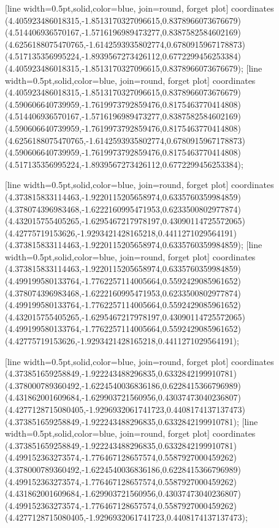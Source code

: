 [line width=0.5pt,solid,color=blue, join=round, forget plot] coordinates {(4.405923486018315,-1.8513170327096615,0.8378966073676679) (4.514406936570167,-1.5716196989473277,0.8387582584602169) (4.6256188075470765,-1.6142593935802774,0.6780915967178873) (4.517135356995224,-1.8939567273426112,0.6772299456253384) (4.405923486018315,-1.8513170327096615,0.8378966073676679)};
[line width=0.5pt,solid,color=blue, join=round, forget plot] coordinates {(4.405923486018315,-1.8513170327096615,0.8378966073676679) (4.590606640739959,-1.7619973792859476,0.8175463770414808) (4.514406936570167,-1.5716196989473277,0.8387582584602169) (4.590606640739959,-1.7619973792859476,0.8175463770414808) (4.6256188075470765,-1.6142593935802774,0.6780915967178873) (4.590606640739959,-1.7619973792859476,0.8175463770414808) (4.517135356995224,-1.8939567273426112,0.6772299456253384)};

[line width=0.5pt,solid,color=blue, join=round, forget plot] coordinates {(4.373815833114463,-1.9220115205658974,0.6335760359984859) (4.378074396983468,-1.6222160995471953,0.6233500802977874) (4.432015755405265,-1.6295467217978197,0.43090114725572065) (4.42775719153626,-1.9293421428165218,0.4411271029564191) (4.373815833114463,-1.9220115205658974,0.6335760359984859)};
[line width=0.5pt,solid,color=blue, join=round, forget plot] coordinates {(4.373815833114463,-1.9220115205658974,0.6335760359984859) (4.499199580133764,-1.7762257114005664,0.5592429085961652) (4.378074396983468,-1.6222160995471953,0.6233500802977874) (4.499199580133764,-1.7762257114005664,0.5592429085961652) (4.432015755405265,-1.6295467217978197,0.43090114725572065) (4.499199580133764,-1.7762257114005664,0.5592429085961652) (4.42775719153626,-1.9293421428165218,0.4411271029564191)};

[line width=0.5pt,solid,color=blue, join=round, forget plot] coordinates {(4.373851659258849,-1.922243488296835,0.6332842199910781) (4.378000789360492,-1.6224540036836186,0.6228415366796989) (4.431862001609684,-1.629903721560956,0.43037473040236807) (4.4277128715080405,-1.9296932061741723,0.4408174137137473) (4.373851659258849,-1.922243488296835,0.6332842199910781)};
[line width=0.5pt,solid,color=blue, join=round, forget plot] coordinates {(4.373851659258849,-1.922243488296835,0.6332842199910781) (4.499152363273574,-1.776467128657574,0.5587927000459262) (4.378000789360492,-1.6224540036836186,0.6228415366796989) (4.499152363273574,-1.776467128657574,0.5587927000459262) (4.431862001609684,-1.629903721560956,0.43037473040236807) (4.499152363273574,-1.776467128657574,0.5587927000459262) (4.4277128715080405,-1.9296932061741723,0.4408174137137473)};

